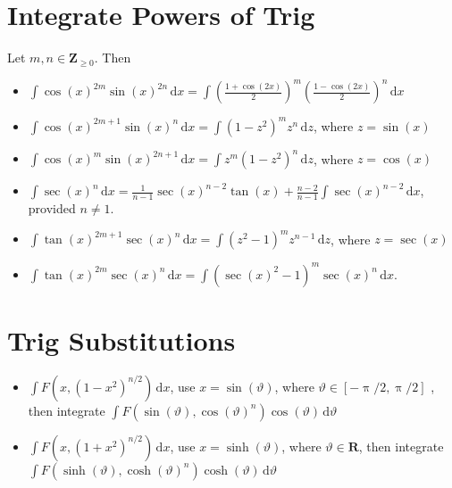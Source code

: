 \documentclass[letterpaper,landscape,9pt,fleqn]{extarticle}
\newcommand{\reals}{\mathbf{R}}
\newcommand{\integers}{\mathbf{Z}}
\begin{document}
\begin{multicols*}{2}
\section*{Integrate Powers of Trig}
\vspace{0.1in}
Let $m,n \in \integers_{\geq 0}$. Then

\begin{itemize}[noitemsep]
  \item $\int \cos(x)^{2m} \sin(x)^{2n} \, \mathrm{d}x
         = \int \left(\frac{1+\cos(2 x)}{2}\right)^m 
                 \left(\frac{1-\cos(2 x)}{2}\right)^n 
                 \, \mathrm{d}x$

  \item $\int \cos(x)^{2m+1} \sin(x)^{n} \, \mathrm{d}x
  = \int (1-z^2)^m  z^{n}
             \, \mathrm{d}z$,  where $z = \sin(x)$

  \item $\int \cos(x)^{m} \sin(x)^{2n+1} \, \mathrm{d}x
             = \int z^m (1-z^2)^n \, \mathrm{d}z$,  
             where $z = \cos(x)$

\item $\int \sec(x)^n \, \mathrm{d} x = \frac{1}{n-1} \sec(x)^{n-2} \tan(x) + \frac{n-2}{n-1} \int \sec(x)^{n-2} \, \mathrm{d} x$,
provided $n \neq 1$.
\item $\int \tan(x)^{2m+1} \sec(x)^n \, \mathrm{d} x =  \int (z^2-1)^m z^{n-1} \, \mathrm{d} z$,
where $z=\sec(x)$

\item $\int \tan(x)^{2m} \sec(x)^n \, \mathrm{d} x  = \int (\sec(x)^2-1)^m \sec(x)^n \, \mathrm{d} x$.


\end{itemize}
              \vspace{0.050in}
\section*{Trig Substitutions}
\vspace{0.25in}
\begin{itemize}[noitemsep]
\item $\int F \left(x, \left(1-x^2\right)^{n/2}\right) \, \mathrm{d} x$, 
use $x = \sin(\vartheta)$, where  $\vartheta \in [-\uppi/2, \uppi/2]$
, then integrate $\int F \left(\sin(\vartheta),\cos(\vartheta)^n\right) \cos(\vartheta) \, \mathrm{d} \vartheta$
\item  $\int F\left(x, \left (1+x^2 \right)^{n/2}\right) \, 
\mathrm{d} x$, use $x = \sinh(\vartheta)$,
where $\vartheta \in \reals$, then integrate
$\int F\left(\sinh(\vartheta), \cosh(\vartheta)^n \right)  \cosh(\vartheta)\, \mathrm{d} \vartheta$


\end{itemize}
\end{multicols*}
\end{document}

